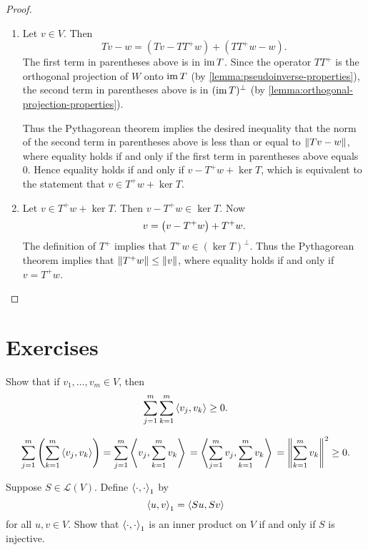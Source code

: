 \begin{proof} \
\begin{enumerate}[label=(\roman*)]
\item Let $v\in V$. Then
\[Tv-w=(Tv-TT^+w)+(TT^+w-w).\]
The first term in parentheses above is in $\operatorname{im} T$. Since the operator $TT^+$ is the orthogonal projection of $W$ onto $\operatorname{im} T$ (by \ref{lemma:pseudoinverse-properties}), the second term in parentheses above is in $(\operatorname{im} T)^\perp$ (by \ref{lemma:orthogonal-projection-properties}).

Thus the Pythagorean theorem implies the desired inequality that the norm of the second term in parentheses above is less than or equal to $\norm{Tv-w}$, where equality holds if and only if the first term in parentheses above equals $0$. Hence equality holds if and only if $v-T^+w+\ker T$, which is equivalent to the statement that $v\in T^+w+\ker T$.

\item Let $v\in T^+w+\ker T$. Then $v-T^+w\in\ker T$. Now
\[v=\left(v-T^+w\right)+T^+w.\]
The definition of $T^+$ implies that $T^+w\in(\ker T)^\perp$. Thus the Pythagorean theorem implies that $\norm{T^+w}\le\norm{v}$, where equality holds if and only if $v=T^+w$.
\end{enumerate}
\end{proof}
\pagebreak

\section*{Exercises}
\begin{exercise}
Show that if $v_1,\dots,v_m\in V$, then
\[\sum_{j=1}^{m}\sum_{k=1}^{m}\left\langle v_j,v_k\right\rangle\ge0.\]
\end{exercise}

\begin{solution}
\[\sum_{j=1}^{m}\left(\sum_{k=1}^{m}\left\langle v_j,v_k\right\rangle\right)
=\sum_{j=1}^{m}\left\langle v_j,\sum_{k=1}^{m}v_k\right\rangle\\
=\left\langle\sum_{j=1}^{m}v_j,\sum_{k=1}^{m}v_k\right\rangle\\
=\norm{\sum_{k=1}^{m}v_k}^2\ge0.\]
\end{solution}

\begin{exercise}
Suppose $S\in\mathcal{L}(V)$. Define $\left\langle\cdot,\cdot\right\rangle_1$ by
\[\left\langle u,v\right\rangle_1=\left\langle Su,Sv\right\rangle\]
for all $u,v\in V$. Show that $\left\langle\cdot,\cdot\right\rangle_1$ is an inner product on $V$ if and only if $S$ is injective.
\end{exercise}

